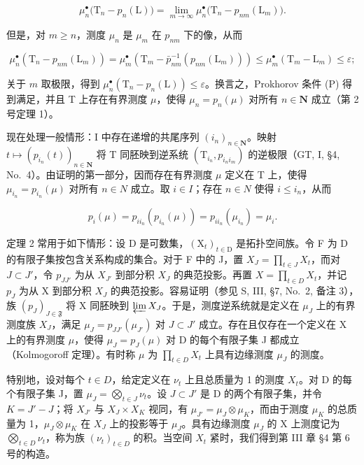 \[
\mu_ {n} ^ {\bullet} \big (\mathrm{T} _ {n} - p _ {n} (\mathrm{L}) \big) = \lim _ {m \rightarrow \infty} \mu_ {n} ^ {\bullet} \big (\mathrm{T} _ {n} - p _ {n m} (\mathrm{L} _ {m}) \big).
\]

但是，对 \(m \geqslant n\)，测度 \(\mu_{n}\) 是 \(\mu_{m}\) 在 \(p_{nm}\) 下的像，从而

\[
\mu_ {n} ^ {\bullet} \left(\mathrm{T} _ {n} - p _ {n m} (\mathrm{L} _ {m})\right) = \mu_ {m} ^ {\bullet} \left(\mathrm{T} _ {m} - \bar {p} _ {n m} ^ {- 1} (p _ {n m} (\mathrm{L} _ {m}))\right) \leqslant \mu_ {m} ^ {\bullet} \left(\mathrm{T} _ {m} - \mathrm{L} _ {m}\right) \leqslant \varepsilon ;
\]

关于 \(m\) 取极限，得到 \(\mu_n^\bullet (\mathrm{T}_n - p_n(\mathrm{L})) \leqslant \varepsilon\)。换言之，Prokhorov 条件 (P) 得到满足，并且 T 上存在有界测度 \(\mu\)，使得 \(\mu_n = p_n(\mu)\) 对所有 \(n \in \mathbf{N}\) 成立（第 2 号定理 1）。

现在处理一般情形：I 中存在递增的共尾序列 \((i_{n})_{n\in\mathbf{N}}\)。映射 \(t\mapsto\left(p_{i_{n}}(t)\right)_{n\in\mathbf{N}}\) 将 T 同胚映到逆系统 \((\mathrm{T}_{i_{n}},p_{i_{n}i_{m}})\) 的逆极限（GT, I, §4, No.~4）。由证明的第一部分，因而存在有界测度 \(\mu\) 定义在 T 上，使得 \(\mu_{i_{n}}=p_{i_{n}}(\mu)\) 对所有 \(n\in N\) 成立。取 \(i\in I\)；存在 \(n\in N\) 使得 \(i\leqslant i_{n}\)，从而

\[
p _ {i} (\mu) = p _ {i i _ {n}} \left(p _ {i _ {n}} (\mu)\right) = p _ {i i _ {n}} \left(\mu_ {i _ {n}}\right) = \mu_ {i}.\tag{Q.E.D.}
\]

定理 2 常用于如下情形：设 D 是可数集，\((\mathrm{X}_{t})_{t\in\mathrm{D}}\) 是拓扑空间族。令 F 为 D 的有限子集按包含关系构成的集合。对于 F 中的 J，置 \(X_{J}=\prod_{t\in J}X_{t}\)，而对 \(J\subset J'\)，令 \(p_{JJ'}\) 为从 \(X_{J'}\) 到部分积 \(X_{J}\) 的典范投影。再置 \(X=\prod_{t\in D}X_{t}\)，并记 \(p_{J}\) 为从 X 到部分积 \(X_{J}\) 的典范投影。容易证明（参见 S, III, §7, No.~2, 备注 3），族 \((p_{J})_{J\in\mathfrak{F}}\) 将 X 同胚映到 \(\varprojlim X_{J}\)。于是，测度逆系统就是定义在 \(\mu_{J}\) 上的有界测度族 \(X_{J}\)，满足 \(\mu_{J}=p_{JJ'}(\mu_{J'})\) 对 \(J\subset J'\) 成立。存在且仅存在一个定义在 X 上的有界测度 \(\mu\)，使得 \(\mu_{J}=p_{J}(\mu)\) 对 D 的每个有限子集 J 都成立（Kolmogoroff 定理）。有时称 \(\mu\) 为 \(\prod_{t\in D}X_{t}\) 上具有边缘测度 \(\mu_{J}\) 的测度。

特别地，设对每个 \(t \in D\)，给定定义在 \(\nu_{t}\) 上且总质量为 1 的测度 \(X_{t}\)。对 D 的每个有限子集 J，置 \(\mu_{J} = \bigotimes_{t \in J} \nu_{t}\)。设 \(J \subset J'\) 是 D 的两个有限子集，并令 \(K = J' - J\)；将 \(X_{J'}\) 与 \(X_{J} \times X_{K}\) 视同，有 \(\mu_{J'} = \mu_{J} \otimes \mu_{K}\)，而由于测度 \(\mu_{K}\) 的总质量为 1，\(\mu_{J} \otimes \mu_{K}\) 在 \(X_{J}\) 上的投影等于 \(\mu_{J}\)。具有边缘测度 \(\mu_{J}\) 的 X 上测度记为 \(\bigotimes_{t \in D} \nu_{t}\)，称为族 \((\nu_{t})_{t \in D}\) 的积。当空间 \(X_{t}\) 紧时，我们得到第 III 章 §4 第 6 号的构造。


